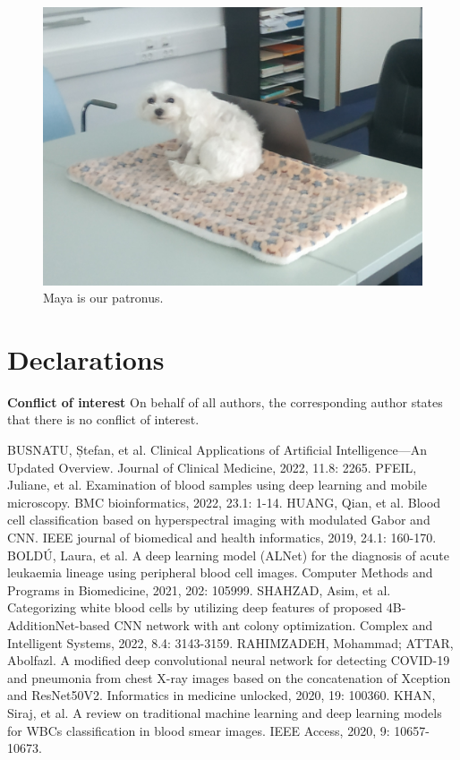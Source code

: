 \documentclass[conference]{IEEEtran}
\begin{document}
\begin{figure}[htbp]
    \begin{center}
    \includegraphics[scale=0.16]{IMG_20221019_165459.jpg}
    \end{center}
    \caption{Maya is our patronus.}
\end{figure}

\section*{Declarations}

\textbf{Conflict of interest} On behalf of all authors, the corresponding author
states that there is no conflict of interest.

\begin{thebibliography}{00}
 BUSNATU, Ștefan, et al. Clinical Applications of Artificial Intelligence—An Updated Overview. Journal of Clinical Medicine, 2022, 11.8: 2265.
 PFEIL, Juliane, et al. Examination of blood samples using deep learning and mobile microscopy. BMC bioinformatics, 2022, 23.1: 1-14.
 HUANG, Qian, et al. Blood cell classification based on hyperspectral imaging with modulated Gabor and CNN. IEEE journal of biomedical and health informatics, 2019, 24.1: 160-170.
 BOLDÚ, Laura, et al. A deep learning model (ALNet) for the diagnosis of acute leukaemia lineage using peripheral blood cell images. Computer Methods and Programs in Biomedicine, 2021, 202: 105999.
 SHAHZAD, Asim, et al. Categorizing white blood cells by utilizing deep features of proposed 4B-AdditionNet-based CNN network with ant colony optimization. Complex and Intelligent Systems, 2022, 8.4: 3143-3159.
 RAHIMZADEH, Mohammad; ATTAR, Abolfazl. A modified deep convolutional neural network for detecting COVID-19 and pneumonia from chest X-ray images based on the concatenation of Xception and ResNet50V2. Informatics in medicine unlocked, 2020, 19: 100360.
 KHAN, Siraj, et al. A review on traditional machine learning and deep learning models for WBCs classification in blood smear images. IEEE Access, 2020, 9: 10657-10673.
\end{thebibliography}
\vspace{12pt}
\color{red}
\end{document}
